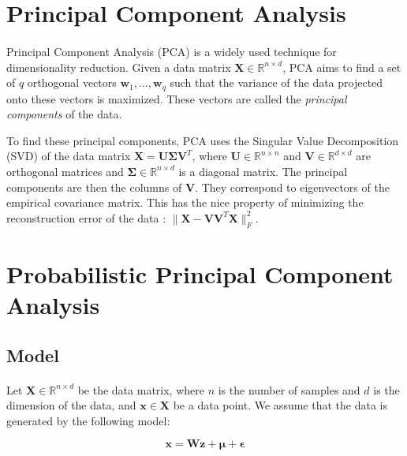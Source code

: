 \documentclass{article}
\newcommand{\R}{\mathbb{R}}
\begin{document}
\section{Principal Component Analysis}
\label{sec:pca}

\paragraph{} Principal Component Analysis (PCA) is a widely used technique for dimensionality reduction. Given a data matrix $\mathbf{X} \in \R^{n \times d}$, PCA aims to find a set of $q$ orthogonal vectors $\mathbf{w}_1, \ldots, \mathbf{w}_q$ such that the variance of the data projected onto these vectors is maximized. These vectors are called the \emph{principal components} of the data.

To find these principal components, PCA uses the Singular Value Decomposition (SVD) of the data matrix $\mathbf{X} = \mathbf{U}\mathbf{\Sigma}\mathbf{V}^T$, where $\mathbf{U} \in \R^{n \times n}$ and $\mathbf{V} \in \R^{d \times d}$ are orthogonal matrices and $\mathbf{\Sigma} \in \R^{n \times d}$ is a diagonal matrix. The principal components are then the columns of $\mathbf{V}$. They correspond to eigenvectors of the empirical covariance matrix. This has the nice property of minimizing the reconstruction error of the data : $\|\mathbf{X} - \mathbf{V}\mathbf{V}^T\mathbf{X}\|_F^2$.

\section{Probabilistic Principal Component Analysis}
\label{sec:ppca}

\subsection{Model}

\paragraph{} Let $\mathbf{X} \in \R^{n \times d}$ be the data matrix, where $n$ is the number of samples and $d$ is the dimension of the data, and $\mathbf{x} \in \mathbf{X}$ be a data point. We assume that the data is generated by the following model:

\begin{equation}
    \label{eq:ppca_model}
    \mathbf{x} = \mathbf{Wz} + \boldsymbol{\mu} + \boldsymbol{\epsilon}
\end{equation}
    
\end{document}
